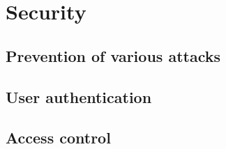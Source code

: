 \chapter{Security}
 
\section{Prevention of various attacks}

\section{User authentication}

\section{Access control}
